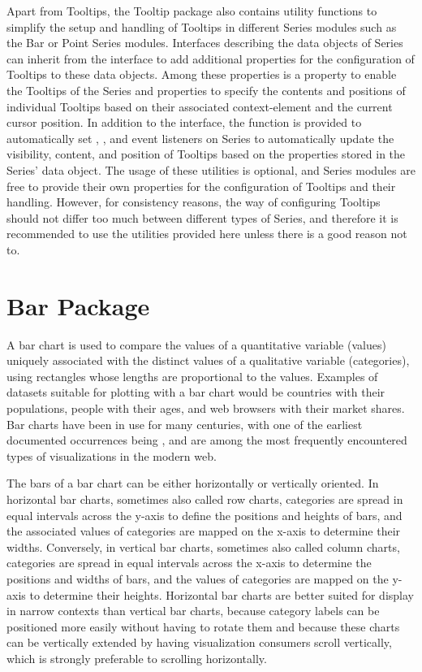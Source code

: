 Apart from Tooltips, the Tooltip package also contains
utility functions to simplify the setup and handling of Tooltips in
different Series modules such as the Bar or Point Series modules.
Interfaces describing the data objects of Series can inherit from the
 interface to add additional properties for
the configuration of Tooltips to these data objects. Among these
properties is a property to enable the Tooltips of the Series and
properties to specify the contents and positions of individual
Tooltips based on their associated context-element and the current
cursor position. In addition to the 
interface, the  function is
provided to automatically set , , and
 event listeners on Series to automatically update the
visibility, content, and position of Tooltips based on the
 properties stored in the Series' data
object. The usage of these utilities is optional, and Series modules
are free to provide their own properties for the configuration of
Tooltips and their handling. However, for consistency reasons, the way
of configuring Tooltips should not differ too much between different
types of Series, and therefore it is recommended to use the utilities
provided here unless there is a good reason not to.





\section{Bar Package}

A bar chart is used to compare the values of a quantitative variable
(values) uniquely associated with the distinct values of a qualitative
variable (categories), using rectangles whose lengths are
proportional to the values. Examples of datasets suitable for plotting
with a bar chart would be countries with their populations, people
with their ages, and web browsers with their market shares. Bar charts
have been in use for many centuries, with one of the earliest
documented occurrences being \textcite{CommercialAndPoliticalAtlas},
and are among the most frequently encountered types of visualizations
in the modern web.

The bars of a bar chart can be either horizontally or vertically
oriented. In horizontal bar charts, sometimes also called row charts,
categories are spread in equal intervals across the y-axis to define
the positions and heights of bars, and the associated values of
categories are mapped on the x-axis to determine their widths.
Conversely, in vertical bar charts, sometimes also called column
charts, categories are spread in equal intervals across the x-axis to
determine the positions and widths of bars, and the values of
categories are mapped on the y-axis to determine their heights.
Horizontal bar charts are better suited for display in narrow contexts
than vertical bar charts, because category labels can be positioned
more easily without having to rotate them and because these charts can
be vertically extended by having visualization consumers scroll
vertically, which is strongly preferable to scrolling horizontally.


